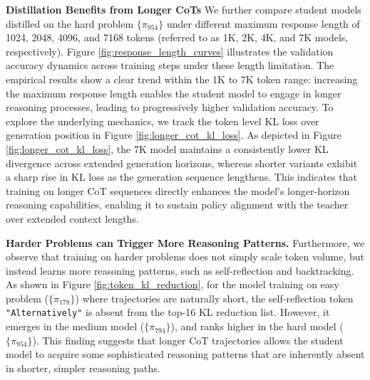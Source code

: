 \textbf{Distillation Benefits from Longer CoTs} We further compare student models distilled on the hard problem $\{\pi_{954}\}$ under different maximum response length of 1024, 2048, 4096, and 7168 tokens (referred to as 1K, 2K, 4K, and 7K models, respectively). Figure \ref{fig:response_length_curves} illustrates the validation accuracy dynamics across training steps under these length limitation. The empirical results show a clear trend within the 1K to 7K token range: increasing the maximum response length enables the student model to engage in longer reasoning processes, leading to progressively higher validation accuracy. To explore the underlying mechanics, we track the token level KL loss over generation position in Figure \ref{fig:longer_cot_kl_loss}. As depicted in Figure \ref{fig:longer_cot_kl_loss}, the 7K model maintains a consistently lower KL divergence across extended generation horizons, whereas shorter variants exhibit a sharp rise in KL loss as the generation sequence lengthens. This indicates that training on longer CoT sequences directly enhances the model's longer-horizon reasoning capabilities, enabling it to sustain policy alignment with the teacher over extended context lengths.


\textbf{Harder Problems can Trigger More Reasoning Patterns.} Furthermore, we observe that training on harder problems does not simply scale token volume, but instead learns more reasoning patterns, such as self-reflection and backtracking. As shown in Figure \ref{fig:token_kl_reduction}, for the model training on easy problem ($\{\pi_{178}\}$) where trajectories are naturally short, the self-reflection token \texttt{"Alternatively"} is absent from the top-16 KL reduction list. However, it emerges in the medium model ($\{\pi_{794}\}$), and ranks higher in the hard model ($\{\pi_{954}\}$). This finding suggests that longer CoT trajectories allows the student model to acquire some sophisticated reasoning patterns that are inherently absent in shorter, simpler reasoning paths.